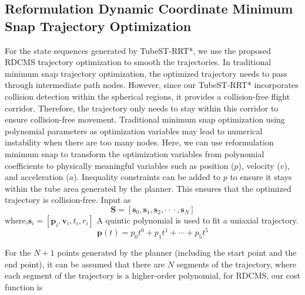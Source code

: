 \documentclass[conference]{IEEEtran}
\begin{document}
    \subsection{Reformulation Dynamic Coordinate Minimum Snap Trajectory Optimization}
    For the state sequences generated by TubeST-RRT*, we use the proposed RDCMS trajectory optimization to smooth the trajectories. In traditional minimum snap trajectory optimization, the optimized trajectory needs to pass through intermediate path nodes. However, since our TubeST-RRT* incorporates collision detection within the spherical regions, it provides a collision-free flight corridor. Therefore, the trajectory only needs to stay within this corridor to ensure collision-free movement. Traditional minimum snap optimization using polynomial parameters as optimization variables may lead to numerical instability when there are too many nodes. Here, we can use reformulation minimum snap to transform the optimization variables from polynomial coefficients to physically meaningful variables such as position ($p$), velocity ($v$), and acceleration ($a$). Inequality constraints can be added to $p$ to ensure it stays within the tube area generated by the planner. This ensures that the optimized trajectory is collision-free.
    Input as
    \begin{equation}
        \boldsymbol{S} = [\boldsymbol{s}_{0},\boldsymbol{s}_{1},\boldsymbol{s}_{2},\cdot{}\cdot{}\cdot{},\boldsymbol{s}_{N}]
    \end{equation}
    where,$\boldsymbol{s}_{i} = [\boldsymbol{p}_{i},\boldsymbol{v}_{i},t_{i},r_{i}]$
    A quintic polynomial is used to fit a uniaxial trajectory.
    \begin{equation}
        \boldsymbol{p}\left( {t}\right)= {p}_{0} {t}^{0}+ {p}_{1} {t}^{1}+\cdots+ {p}_{5} {t}^{5}
    \end{equation}

    For the $N+1$ points generated by the planner (including the start point and the end point), it can be assumed that there are $N$ segments of the trajectory, where each segment of the trajectory is a higher-order polynomial, for RDCMS, our cost function is
\end{document}
